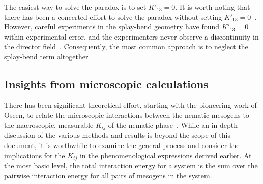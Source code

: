 The easiest way to solve the paradox is to set $K'_{13} = 0$.
It is worth noting that there has been a concerted effort to solve the paradox without setting $K'_{13} = 0$~\cite{RN220,RN221,RN55,RN222}.
However, careful experiments in the splay-bend geometry have found $K'_{13} = 0$ within experimental error, and the experimenters never observe a discontinuity in the director field~\cite{RN312}.
Consequently, the most common approach is to neglect the splay-bend term altogether~\cite{RN55,RN222}.


\subsection{Insights from microscopic calculations}
There has been significant theoretical effort, starting with the pioneering work of Oseen, to relate the microscopic interactions between the nematic mesogens to the macroscopic, measurable $K_{ij}$ of the nematic phase~\cite{RN56,RN55,RN205,RN217,RN225,RN224,RN218,RN222}.
While an in-depth discussion of the various methods and results is beyond the scope of this document, it is worthwhile to examine the general process and consider the implications for the $K_{ij}$ in the phenomenological expressions derived earlier.
At the most basic level, the total interaction energy for a system is the sum over the pairwise interaction energy for all pairs of mesogens in the system.

